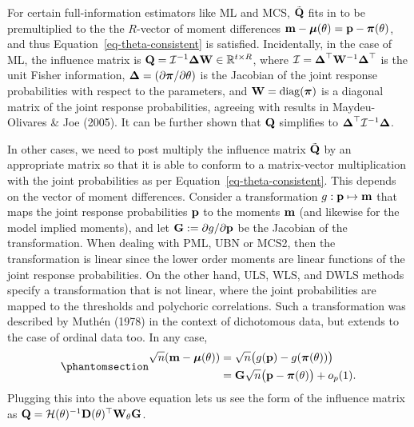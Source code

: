 \documentclass[
  letterpaper,
  DIV=11,
  numbers=noendperiod]{scrartcl}
\begin{document}
For certain full-information estimators like ML and MCS, \(\tilde {{\mathbf Q}}\)
fits in to be premultiplied to the the \(R\)-vector of moment
differences \({\mathbf m} - {\boldsymbol\mu}(\theta) = {\mathbf p} - {\boldsymbol\pi}(\theta)\), and thus
Equation~\ref{eq-theta-consistent} is satisfied. Incidentally, in the
case of ML, the influence matrix is
\({\mathbf Q} = {\mathcal I}^{-1} {\boldsymbol\Delta} {\mathbf W} \in \mathbb{R}^{t \times R}\), where
\({\mathcal I}= {\boldsymbol\Delta}^\top {\mathbf W}^{-1} {\boldsymbol\Delta}^\top\) is the unit Fisher
information, \({\boldsymbol\Delta}= (\partial {\boldsymbol\pi} / \partial \theta)\) is the
Jacobian of the joint response probabilities with respect to the
parameters, and \({\mathbf W} = \operatorname{diag}({\boldsymbol\pi})\) is a diagonal matrix of the joint
response probabilities, agreeing with results in Maydeu-Olivares \& Joe
(2005). It can be further shown that \({\mathbf Q}\) simplifies to
\({\boldsymbol\Delta}^\top {\mathcal I}^{-1} {\boldsymbol\Delta}\).

In other cases, we need to post multiply the influence matrix
\(\tilde{{\mathbf Q}}\) by an appropriate matrix so that it is able to conform to
a matrix-vector multiplication with the joint probabilities as per
Equation~\ref{eq-theta-consistent}. This depends on the vector of moment
differences. Consider a transformation \(g: {\mathbf p} \mapsto {\mathbf m}\) that maps
the joint response probabilities \({\mathbf p}\) to the moments \({\mathbf m}\) (and
likewise for the model implied moments), and let
\({\mathbf G} := \partial g / \partial {\mathbf p}\) be the Jacobian of the
transformation. When dealing with PML, UBN or MCS2, then the
transformation is linear since the lower order moments are linear
functions of the joint response probabilities. On the other hand, ULS,
WLS, and DWLS methods specify a transformation that is not linear, where
the joint probabilities are mapped to the thresholds and polychoric
correlations. Such a transformation was described by Muthén (1978) in
the context of dichotomous data, but extends to the case of ordinal data
too. In any case,
\begin{equation}\phantomsection\label{eq-moments-transform}{
\begin{aligned}
\sqrt n (\bmm - \bmu(\theta)) 
&= \sqrt n \big(g(\bp) - g(\bpi(\theta))\big) \\
&= \bG \sqrt n \big(\bp - \bpi(\theta)\big) + o_p(1).
\end{aligned}
}\end{equation} Plugging this into the above equation lets us see the
form of the influence matrix as
\({\mathbf Q} = {\mathcal H}(\theta)^{-1} {\mathbf D}(\theta)^\top {\mathbf W}_{\theta} {\mathbf G}\).
\end{document}
